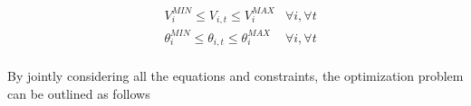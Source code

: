 \begin{subequations}
\begin{align*}
&V_{i}^{MIN} \leq V_{i,t} \leq V_{i}^{MAX} &\forall i,\forall t  \\
&\theta_{i}^{MIN} \leq \theta_{i,t}  \leq \theta_{i}^{MAX}  &\forall i,\forall t  \\ 
\end{align*}
\end{subequations}


\newpage
By jointly considering all the equations and constraints, the optimization problem can be outlined as follows
